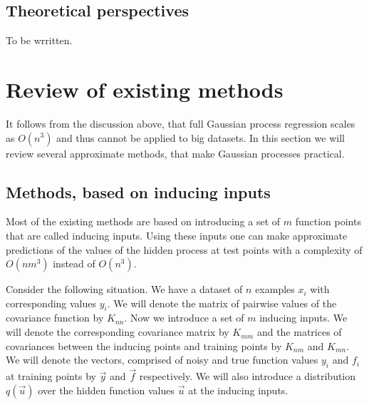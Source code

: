 \documentclass[12pt]{article}
\begin{document}
\subsection{Theoretical perspectives}
	\hspace{0.6cm}To be wrritten.

\pagebreak
\section{Review of existing methods}

\hspace{0.6cm}It follows from the discussion above, that full Gaussian process regression scales as $O(n^3)$ and thus cannot be applied to big datasets. In this section we will review several approximate methods, that make Gaussian processes practical.

\subsection{Methods, based on inducing inputs}
	\hspace{0.6cm}Most of the existing methods are based on introducing a set of $m$ function points that are called inducing inputs. Using these inputs one can make approximate predictions of the values of the hidden process at test points with a complexity of $O(nm^3)$ instead of $O(n^3)$.
	
	Consider the following situation. We have a dataset of $n$ examples $x_i$ with corresponding values $y_i$. We will denote the matrix of pairwise values of the covariance function by $K_{nn}$. Now we introduce a set of $m$ inducing inputs. We will denote the corresponding covariance matrix by $K_{mm}$ and the matrices of covariances between the inducing points and training points by $K_{nm}$ and $K_{mn}$. We will denote the vectors, comprised of noisy and true function values $y_i$ and $f_i$ at training points by $\vec y$ and $\vec f$ respectively. We will also introduce a distribution $q(\vec u)$ over the hidden function values $\vec u$ at the inducing inputs.
	
	
	
\end{document}

